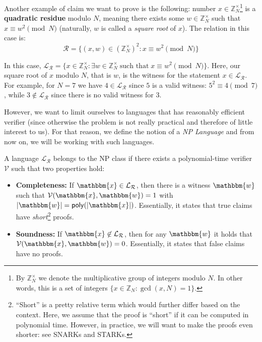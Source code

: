 \documentclass[../lecture-notes-148x210.tex]{subfiles}
\begin{document}
\begin{example}
    Another example of claim we want to prove is the following: number $x \in \mathbb{Z}_N^{\times}$\footnote{By $\mathbb{Z}_N^{\times}$ we denote the multiplicative group of integers modulo $N$. In other words, this is a set of integers $\{x \in \mathbb{Z}_N: \gcd(x, N) = 1\}$.} is a \textbf{quadratic residue} modulo $N$, meaning there exists some $w \in \mathbb{Z}_N^{\times}$ such that $x \equiv w^2 \pmod{N}$ (naturally, $w$ is called a \textit{square root} of $x$). The relation in this case is:
    \begin{equation*}
        \mathcal{R} = \{ (x, w) \in (\mathbb{Z}_N^{\times})^2: x \equiv w^2 \pmod{N} \}
    \end{equation*}

    In this case, $\mathcal{L}_{\mathcal{R}} = \{x \in \mathbb{Z}_N^{\times}: \exists w \in \mathbb{Z}_N^{\times} \; \text{such that} \; x \equiv w^2 \pmod{N}\}$. Here, our square root of $x$ modulo $N$, that is $w$, is the witness for the statement $x \in \mathcal{L}_{\mathcal{R}}$. For example, for $N=7$ we have $4 \in \mathcal{L}_{\mathcal{R}}$ since $5$ is a valid witness: $5^2 \equiv 4 \pmod{7}$, while $3 \not\in \mathcal{L}_{\mathcal{R}}$ since there is no valid witness for $3$.
\end{example}

However, we want to limit ourselves to languages that has reasonably efficient
verifier (since otherwise the problem is not really practical and therefore of
little interest to us). For that reason, we define the notion of a \emph{NP
Language} and from now on, we will be working with such languages.

\begin{definition}[NP Language]
    A language $\mathcal{L}_{\mathcal{R}}$ belongs to the NP class if there
    exists a polynomial-time verifier $\mathcal{V}$ such that two properties
    hold:
    \begin{itemize}
        \item \textbf{Completeness:} If $\mathbbm{x} \in
        \mathcal{L}_{\mathcal{R}}$, then there is a witness $\mathbbm{w}$ such
        that $\mathcal{V}(\mathbbm{x}, \mathbbm{w}) = 1$ with $|\mathbbm{w}| =
        \mathsf{poly}(|\mathbbm{x}|)$. Essentially, it states that true claims
        have \textit{short}\footnote{``Short'' is a pretty relative term which
        would further differ based on the context. Here, we assume that the
        proof is ``short'' if it can be computed in polynomial time. However, in
        practice, we will want to make the proofs even shorter: see SNARKs and
        STARKs.} proofs.
        \item \textbf{Soundness:} If $\mathbbm{x} \not\in
        \mathcal{L}_{\mathcal{R}}$, then for any $\mathbbm{w}$ it holds that
        $\mathcal{V}(\mathbbm{x}, \mathbbm{w}) = 0$. Essentially, it states that
        false claims have no proofs.
    \end{itemize}
\end{definition}
\end{document}
